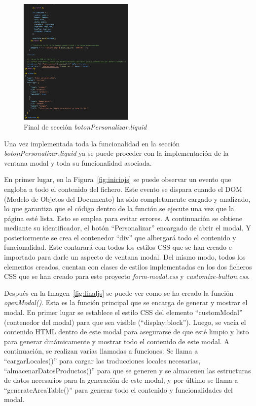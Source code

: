\documentclass[11pt]{article}
\begin{document}
\begin{figure}[H]
    \centering
    \includegraphics[width=0.5\textwidth]{imagenesUS3-section/finalSeccion.png}
    \caption{\label{fig:finalSeccion} Final de sección \textit{botonPersonalizar.liquid}}
    \vspace{\fill}
\end{figure}

Una vez implementada toda la funcionalidad en la sección \textit{botonPersonalizar.liquid} ya se puede proceder con la implementación de la ventana
modal y toda su funcionalidad asociada.

En primer lugar, en la Figura~\ref{fig:iniciojs} se puede observar un evento que engloba a todo el contenido del fichero. Este evento se dispara cuando el DOM (Modelo de Objetos del Documento) ha 
sido completamente cargado y analizado, lo que garantiza que el código dentro de la función se ejecute una vez que la página esté lista. Esto se emplea para evitar errores.
A continuación se obtiene mediante su identificador, el botón ``Personalizar'' encargado de abrir el modal. Y posteriormente se crea el contenedor ``div'' que albergará 
todo el contenido y funcionalidad. Este contarará con todos los estilos CSS que se han creado e importado para darle un aspecto de ventana modal. Del mismo modo, todos los elementos
creados, cuentan con clases de estilos implementadas en los dos ficheros CSS que se han creado para este proyecto \textit{form-modal.css} y \textit{customize-button.css}.

Después en la Imagen~\ref{fig:finaljs} se puede ver como se ha creado la función \textit{openModal()}. Esta es la función principal que se encarga
de generar y mostrar el modal. En primer lugar se establece el estilo CSS del elemento ``customModal'' (contenedor del modal) para que sea visible (``display:block'').
Luego, se vacía el contenido HTML dentro de este modal para asegurarse de que esté limpio y listo para generar dinámicamente y mostrar todo el contenido de este modal.
A continuación, se realizan varias llamadas a funciones: Se llama a ``cargarLocales()'' para cargar las traducciones locales necesarias, ``almacenarDatosProductos()'' para que se generen
y se almacenen las estructuras de datos necesarios para la generación de este modal, y por último se llama a ``generateAreaTable()'' para generar todo el contenido y funcionalidades
del modal. 
\end{document}
